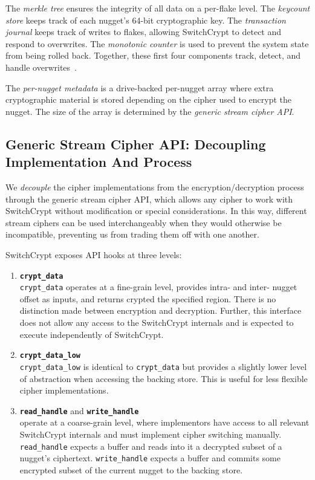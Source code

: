 The \emph{merkle tree} ensures the integrity of all data on a per-flake level.
The \emph{keycount store} keeps track of each nugget's 64-bit cryptographic key.
The \emph{transaction journal} keeps track of writes to flakes, allowing
SwitchCrypt to detect and respond to overwrites. The \emph{monotonic counter} is
used to prevent the system state from being rolled back. Together, these first
four components track, detect, and handle overwrites~\cite{StrongBox}.

The \emph{per-nugget metadata} is a drive-backed per-nugget array where extra
cryptographic material is stored depending on the cipher used to encrypt the
nugget. The size of the array is determined by the \emph{generic stream cipher
API}.

\subsection{Generic Stream Cipher API: Decoupling Implementation And Process}

We \emph{decouple} the cipher implementations from the encryption/decryption
process through the generic stream cipher API, which allows any cipher to work
with SwitchCrypt without modification or special considerations. In this way,
different stream ciphers can be used interchangeably when they would otherwise
be incompatible, preventing us from trading them off with one another.

SwitchCrypt exposes API hooks at three levels:

\begin{enumerate}
   \item \textbf{\texttt{crypt\_data}}\\\texttt{crypt\_data}
   operates at a fine-grain level, provides intra- and inter- nugget offset as
    inputs, and returns crypted the specified region. There is no distinction
    made between encryption and decryption. Further, this interface does not
    allow any access to the SwitchCrypt internals and is expected to execute
    independently of SwitchCrypt.

   \item \textbf{\texttt{crypt\_data\_low}}\\\texttt{crypt\_data\_low}
   is identical to \texttt{crypt\_data} but provides a slightly lower level of
   abstraction when accessing the backing store. This is useful for less
   flexible cipher implementations.

   \item \textbf{\texttt{read\_handle}} and \textbf{\texttt{write\_handle}}\\
   operate at a coarse-grain level, where implementors have access to all
   relevant SwitchCrypt internals and must implement cipher switching manually.
   \texttt{read\_handle} expects a buffer and reads into it a decrypted subset
   of a nugget's ciphertext. \texttt{write\_handle} expects a buffer
   and commits some encrypted subset of the current nugget to the backing store.
\end{enumerate}

